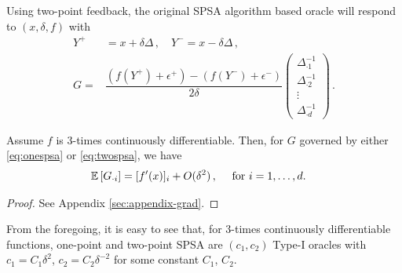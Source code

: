 % 
Using two-point feedback, the original SPSA algorithm \citep{spall1992multivariate} based oracle    
will respond to $(x,\delta,f)$ with
\begin{align}
Y^+ &= x+\delta \Delta \,,\quad
Y^- = x-\delta \Delta \,, \\
G =& \dfrac{\left(f(Y^+)+\epsilon^+\right) - \left(f(Y^-)+\epsilon^-\right)}{2\delta}\begin{pmatrix}\Delta_{\cdot1}^{-1}\\\Delta_{\cdot2}^{-1}\\ \vdots\\ \Delta_{\cdot
 d}^{-1}\end{pmatrix} \,.
 \label{eq:twospsa}
\end{align}

\begin{proposition}
\label{prop:grad-spsa}
 Assume $f$ is $3$-times continuously differentiable. Then, for $G$ governed by either \eqref{eq:onespsa} or \eqref{eq:twospsa}, we have
 \begin{align*}
&\mathbb{E}\left[G_{\cdot i}\right]= [f'(x)]_i +O(\delta^2) \,, \quad \text{ for } i=1,\ldots,d.
\end{align*}
\end{proposition}
\begin{proof}
 See Appendix \ref{sec:appendix-grad}.
\end{proof}

From the foregoing, it is easy to see that, for $3$-times continuously differentiable functions, one-point and two-point SPSA are $(c_1,c_2)$ Type-I oracles with $c_1 = C_1 \delta^2$, $c_2 = C_2 \delta^{-2}$ for some constant $C_1$, $C_2$.



